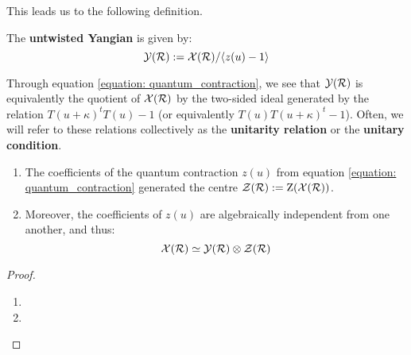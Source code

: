         This leads us to the following definition.
        \begin{definition} \label{def: untwisted_yangians}
            The \textbf{untwisted Yangian} is given by:
                $$\mathcal{Y}(\mathcal{R}) := \mathcal{X}(\mathcal{R})/\langle z(u) - 1\rangle$$
        \end{definition}
        \begin{remark}[Unitarity]
            Through equation \eqref{equation: quantum_contraction}, we see that $\mathcal{Y}(\mathcal{R})$ is equivalently the quotient of $\mathcal{X}(\mathcal{R})$ by the two-sided ideal generated by the relation $T(u + \kappa)^t T(u) - 1$ (or equivalently $T(u) T(u + \kappa)^t - 1$). Often, we will refer to these relations collectively as the \textbf{unitarity relation} or the \textbf{unitary condition}.
        \end{remark}
        \begin{lemma} \label{lemma: centres_of_extended_untwisted_yangians}
            \begin{enumerate}
                \item The coefficients of the quantum contraction $z(u)$ from equation \eqref{equation: quantum_contraction} generated the centre $\mathcal{Z}(\mathcal{R}) := \mathrm{Z}( \mathcal{X}(\mathcal{R}) )$.
                \item Moreover, the coefficients of $z(u)$ are algebraically independent from one another, and thus:
                    $$\calX(\calR) \cong \calY(\calR) \tensor \calZ(\calR)$$
            \end{enumerate}
        \end{lemma}
            \begin{proof}
                \begin{enumerate}
                    \item 
                    \item 
                \end{enumerate}
            \end{proof}
    
        \begin{definition} \label{def: (extended)_twisted_yangians}
            
        \end{definition}
    
